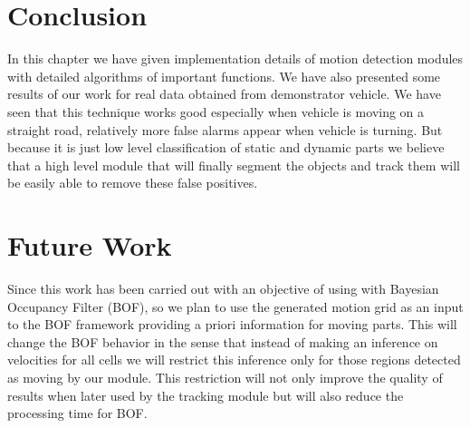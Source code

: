 \section{Conclusion}
In this chapter we have given implementation details of motion detection modules with detailed algorithms of important functions. We have also presented some results of our work for real data obtained from demonstrator vehicle. We have seen that this technique works good especially when vehicle is moving on a straight road, relatively more false alarms appear when vehicle is turning. But because it is just low level classification of static and dynamic parts we believe that a high level module that will finally segment the objects and track them will be easily able to remove these false positives.

\section{Future Work}
Since this work has been carried out with an objective of using with Bayesian Occupancy Filter (BOF), so we plan to use the generated motion grid as an input to the BOF framework providing a priori information for moving parts. This will change the BOF behavior in the sense that instead of making an inference on velocities for all cells we will restrict this inference only for those regions detected as moving by our module. This restriction will not only improve the quality of results when later used by the tracking module but will also reduce the processing time for BOF.
